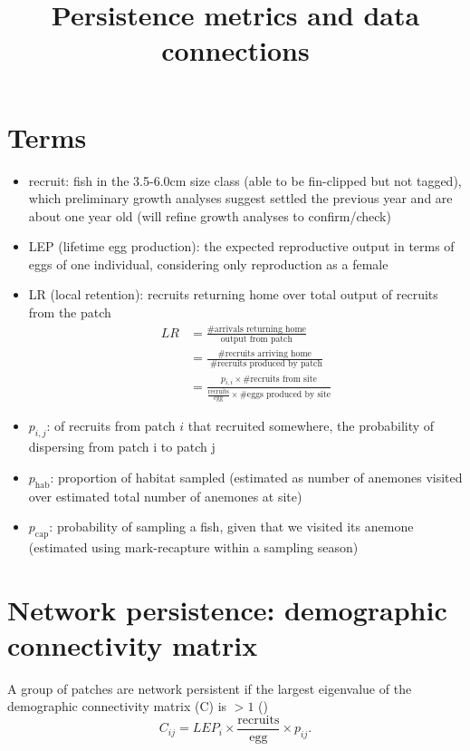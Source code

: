 \documentclass[12pt, oneside]{article}   	%
\title{Persistence metrics and data connections}
\begin{document}
\date{}
\maketitle{}
\section{Terms}
\begin{itemize}
	\item recruit: fish in the 3.5-6.0cm size class (able to be fin-clipped but not tagged), which preliminary growth analyses suggest settled the previous year and are about one year old (will refine growth analyses to confirm/check)
	\item LEP (lifetime egg production): the expected reproductive output in terms of eggs of one individual, considering only reproduction as a female
	\item LR (local retention): recruits returning home over total output of recruits from the patch
		\begin{equation}
			\begin{split}
				LR & = \frac{\text{\# arrivals returning home}}{\text{output from patch}} \\
				   & = \frac{\text{\# recruits arriving home}}{\text{ \# recruits produced by patch}} \\
				   & = \frac{p_{i,i} \times \text{\# recruits from site}}{\frac{\text{recruits}}{\text{egg}} \times \text{\# eggs produced by site}}
			\end{split}
		\end{equation}
	\item $p_{i,j}$: of recruits from patch $i$ that recruited somewhere, the probability of dispersing from patch i to patch j
	\item $p_{\text{hab}}$: proportion of habitat sampled (estimated as number of anemones visited over estimated total number of anemones at site)
	\item $p_{\text{cap}}$: probability of sampling a fish, given that we visited its anemone (estimated using mark-recapture within a sampling season)
\end{itemize}

\section{Network persistence: demographic connectivity matrix}
A group of patches are network persistent if the largest eigenvalue of the demographic connectivity matrix (C) is $ > 1$ (\cite{burgess2014beyond,lyselpopulation})
\begin{equation}
C_{ij} = LEP_i \times \frac{\text{recruits}}{\text{egg}} \times p_{ij}.
\end{equation}
\end{document}
